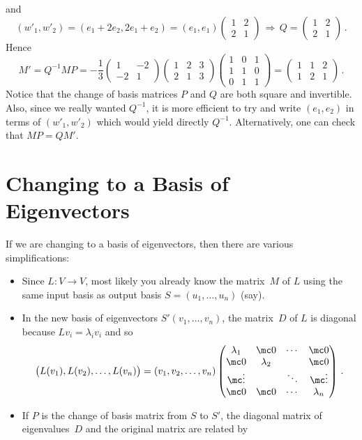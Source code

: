 \begin{example}
\[\]
and
\[
(w'_1,w'_2)=(e_1+2e_2,2e_1+e_2)=(e_1,e_1)\begin{pmatrix}1&2\\2&1\end{pmatrix}\, \Rightarrow\, Q=\begin{pmatrix}1&2\\2&1\end{pmatrix}\, .
\]
Hence
\[
M'=Q^{-1}MP = -\frac{1}{3}\begin{pmatrix}1&-2\\-2&1\end{pmatrix}\begin{pmatrix}1&2&3\\2&1&3\end{pmatrix}
\begin{pmatrix}1&0&1\\1&1&0\\0&1&1\end{pmatrix}=\begin{pmatrix}1&1&2\\1&2&1\end{pmatrix}\, .
\]
Notice that the change of basis matrices $P$ and $Q$ are both square and invertible. Also, since we really wanted $Q^{-1}$, 
it is more efficient to try and write $(e_1,e_2)$ in terms of $(w'_1,w'_2)$ which would yield directly $Q^{-1}$. Alternatively, one can check that
$MP=QM'$.
\end{example}

\section{Changing to a Basis of Eigenvectors}

If we are changing to a basis of eigenvectors, then there are various simplifications:
\begin{itemize}
\item Since $L:V\to V$, most likely you already know the matrix~$M$ of $L$ using the same input basis as output basis $S=(u_1,\ldots ,u_n)$ (say).
\item In the new basis of eigenvectors $S'(v_1,\ldots,v_n)$, the matrix~$D$ of $L$ is diagonal because $Lv_i=\lambda_i v_i$ and so
\[
\big(L(v_1),L(v_2),\ldots,L(v_n)\big)=(v_1,v_2,\ldots, v_n)
\begin{pmatrix}
\lambda_1&\mc0&\cdots&\mc0\\
\mc0&\lambda_2&&\mc0\\
\mc\vdots&&\ddots&\mc\vdots \\
\mc0&\mc0&\cdots&\lambda_n\end{pmatrix}\, .
\]
\item If $P$ is the change of basis matrix from $S$ to $S'$, the diagonal matrix of eigenvalues~$D$ and the original matrix are related by
\end{itemize}

